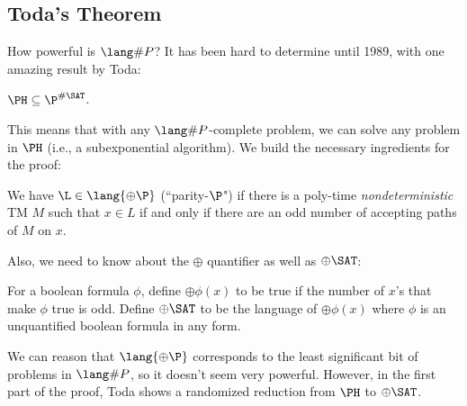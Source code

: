 \subsection{Toda's Theorem}
How powerful is $\SharpP$? It has been hard to determine until 1989, with one amazing result by Toda:
\begin{theorem}
$\PH \subseteq \P^{\#\SAT}$. 
\end{theorem}
This means that with any $\SharpP$-complete problem, we can solve any problem in $\PH$ (i.e., a subexponential algorithm). We build the necessary ingredients for the proof:

\newcommand{\Parity}{\oplus}
\newcommand{\ParityP}{\lang{\Parity\P}}
\begin{definition}
We have $\L \in \ParityP$ (``parity-$\P$") if there is a poly-time \emph{nondeterministic} TM $M$ such that $x \in L$ if and only if there are an odd number of accepting paths of $M$ on $x$. 
\end{definition}
\newcommand{\ParitySAT}{\Parity\SAT}
Also, we need to know about the $\Parity$ quantifier as well as $\ParitySAT$:
\begin{definition}
For a boolean formula $\phi$, define $\Parity\phi(x)$ to be true if the number of $x$'s that make $\phi$ true is odd. Define $\ParitySAT$ to be the language of $\Parity\phi(x)$ where $\phi$ is an unquantified boolean formula in any form.
\end{definition}
We can reason that $\ParityP$ corresponds to the least significant bit of problems in $\SharpP$, so it doesn't seem very powerful. However, in the first part of the proof, Toda shows a randomized reduction from $\PH$ to $\ParitySAT$. 
